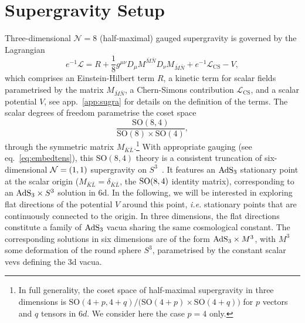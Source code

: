 \documentclass[11pt,a4paper]{article}
\newcommand{\bK}{{\bar{K}}}
\newcommand{\bL}{{\bar{L}}}
\newcommand{\bM}{{\bar{M}}}
\newcommand{\bN}{{\bar{N}}}
\begin{document}
\section{Supergravity Setup} \label{sec:sugra}
Three-dimensional $\mathcal{N}=8$ (half-maximal) gauged supergravity is governed by the Lagrangian~\cite{Nicolai:2001ac,deWit:2003ja}
%
\begin{equation}	\label{eq: lagrangian_rephrased} 
	e^{-1}\mathcal{L}=R+\frac1{8}g^{\mu\nu}D_\mu M^{\bM\bN}D_\nu M_{\bM\bN}+e^{-1}\mathcal{L}_{\text{CS}}-V,
\end{equation}
%
which comprises an Einstein-Hilbert term $R$, a kinetic term for scalar fields parametrised by the matrix $M_{\bM\bN}$, a Chern-Simons contribution $\mathcal{L}_{\text{CS}}$, and a scalar potential $V$, see app.~\ref{app:sugra} for details on the definition of the terms. The scalar degrees of freedom parametrise the coset space
%
\begin{equation}	\label{eq: scalarcoset_rephrased}
	\frac{\text{SO}(8,4)}{\text{SO}(8)\times\text{SO}(4)},
\end{equation}
%
through the symmetric matrix $M_{\bK\bL}$.\footnote{In full generality, the coset space of half-maximal supergravity in three dimensions is $\text{SO}(4+p,4+q)/\big(\text{SO}(4+p)\times\text{SO}(4+q)\big)$ for $p$ vectors and $q$ tensors in 6$d$. We consider here the case $p=4$ only.} With appropriate gauging (see eq.~\eqref{eq:embedtens}), this $\text{SO}(8,4)$ theory is a consistent truncation of six-dimensional ${\cal N}=(1,1)$ supergravity on $S^{3}$~\cite{Cvetic:2000dm,Deger:2014ofa,Hohm:2017wtr}. It features an ${\rm AdS}_{3}$ stationary point at the scalar origin ($M_{\bK\bL}=\delta_{\bK\bL}$, the ${\rm SO}(8,4)$ identity matrix), corresponding to an ${\rm AdS}_{3}\times S^{3}$ solution in 6d. In the following, we will be interested in exploring flat directions of the potential $V$ around this point, \textit{i.e.} stationary points that are continuously connected to the origin. In three dimensions, the flat directions constitute a family of ${\rm AdS}_{3}$ vacua sharing the same cosmological constant. The corresponding solutions in six dimensions are of the form ${\rm AdS}_{3}\times M^{3}$, with $M^{3}$ some deformation of the round sphere $S^{3}$, parametrised by the constant scalar vevs defining the 3d vacua.
\end{document}
